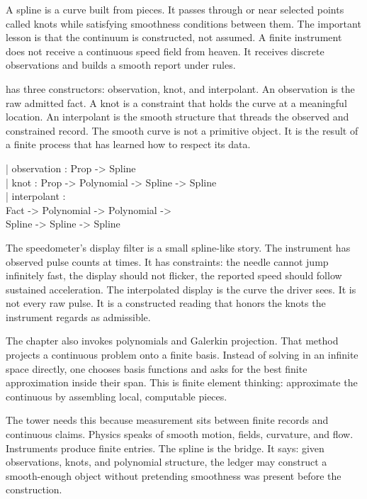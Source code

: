 A spline is a curve built from pieces. It passes through or near selected
points called knots while satisfying smoothness conditions between them. The
important lesson is that the continuum is constructed, not assumed. A finite
instrument does not receive a continuous speed field from heaven. It receives
discrete observations and builds a smooth report under rules.

 has three constructors: observation, knot, and interpolant. An
observation is the raw admitted fact. A knot is a constraint that holds the
curve at a meaningful location. An interpolant is the smooth structure that
threads the observed and constrained record. The smooth curve is not a
primitive object. It is the result of a finite process that has learned how to
respect its data.

\begin{leancode}
| observation : Prop -> Spline\\
| knot : Prop -> Polynomial -> Spline -> Spline\\
| interpolant :\\
\quad Fact -> Polynomial -> Polynomial ->\\
\quad Spline -> Spline -> Spline
\end{leancode}

The speedometer's display filter is a small spline-like story. The instrument
has observed pulse counts at times. It has constraints: the needle cannot jump
infinitely fast, the display should not flicker, the reported speed should
follow sustained acceleration. The interpolated display is the curve the driver
sees. It is not every raw pulse. It is a constructed reading that honors the
knots the instrument regards as admissible.

The chapter also invokes polynomials and Galerkin projection. That method
projects a continuous problem onto a finite basis. Instead of solving in an
infinite space directly, one chooses basis functions and asks for the best
finite approximation inside their span. This is finite element thinking:
approximate the continuous by assembling local, computable pieces.

The tower needs this because measurement sits between finite records and
continuous claims. Physics speaks of smooth motion, fields, curvature, and
flow. Instruments produce finite entries. The spline is the bridge. It says:
given observations, knots, and polynomial structure, the ledger may construct a
smooth-enough object without pretending smoothness was present before the
construction.

